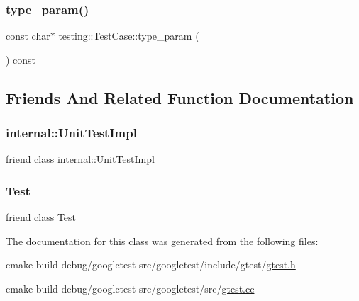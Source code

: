 \subsubsection{\texorpdfstring{type\_param()}{type\_param()}}
{\footnotesize\ttfamily const char$\ast$ testing\+::\+Test\+Case\+::type\+\_\+param (\begin{DoxyParamCaption}{ }\end{DoxyParamCaption}) const\hspace{0.3cm}{\ttfamily [inline]}}



\subsection{Friends And Related Function Documentation}
\mbox{\label{classtesting_1_1TestCase_acc0a5e7573fd6ae7ad1878613bb86853}} 
\subsubsection{\texorpdfstring{internal::UnitTestImpl}{internal::UnitTestImpl}}
{\footnotesize\ttfamily friend class internal\+::\+Unit\+Test\+Impl\hspace{0.3cm}{\ttfamily [friend]}}

\mbox{\label{classtesting_1_1TestCase_a5b78b1c2e1fa07ffed92da365593eaa4}} 
\subsubsection{\texorpdfstring{Test}{Test}}
{\footnotesize\ttfamily friend class \mbox{\hyperlink{classtesting_1_1Test}{Test}}\hspace{0.3cm}{\ttfamily [friend]}}



The documentation for this class was generated from the following files\+:\begin{DoxyCompactItemize}
\item 
cmake-\/build-\/debug/googletest-\/src/googletest/include/gtest/\mbox{\hyperlink{gtest_8h}{gtest.\+h}}\item 
cmake-\/build-\/debug/googletest-\/src/googletest/src/\mbox{\hyperlink{gtest_8cc}{gtest.\+cc}}\end{DoxyCompactItemize}
